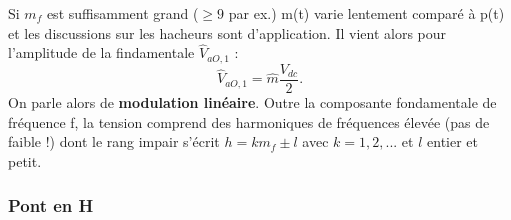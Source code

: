 			 Si $m_f$ est suffisamment grand ($\geq 9$ par ex.) m(t) varie lentement comparé à p(t) et les discussions sur les hacheurs sont d'application. Il vient alors pour l'amplitude de la findamentale $\hat{V}_{aO,1}$ : 
			 \begin{equation}
			 	\hat{V}_{aO,1} = \hat{m}\frac{V_{dc}}{2}.
			 \end{equation}
			 On parle alors de \textbf{modulation linéaire}. Outre la composante fondamentale de fréquence f, la tension comprend des harmoniques de fréquences élevée (pas de faible !) dont le rang impair s'écrit $h = km_f \pm l$ avec $k=1,2,...$ et $l$ entier et petit. 
			
		\subsubsection{Pont en H}
			
				